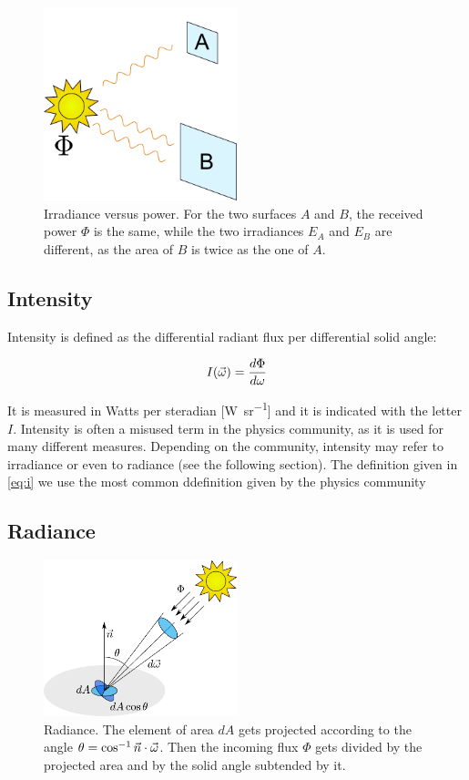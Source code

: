 \begin{figure}[!ht]
\centering
\includegraphics[width=0.5\textwidth]{images/irradiance.pdf}
\caption{Irradiance versus power. For the two surfaces $A$ and $B$, the received power $\Phi$ is the same, while the two irradiances $E_A$ and $E_B$ are different, as the area of $B$ is twice as the one of $A$.}
\label{fig:irradiance}
\end{figure}
 

\subsection{Intensity}
Intensity is defined as the differential radiant flux per differential solid angle:

$$
I(\vec{\omega}) = \frac{d \Phi}{d \omega}
\label{eq:i}
$$

It is measured in Watts per steradian [\si{\watt\per\steradian}] and it is indicated with the letter $I$. Intensity is often a misused term in the physics community, as it is used for many different measures. Depending on the community, intensity may refer to irradiance or even to radiance (see the following section). The definition given in \ref{eq:i} we use the most common ddefinition given by the physics community

\subsection{Radiance}

\begin{figure}[!ht]
\centering
\includegraphics[width=0.5\textwidth]{images/radiance.pdf}
\caption{Radiance. The element of area $dA$ gets projected according to the angle $\theta = \cos^{-1}{\vec{n} \cdot \vec{\omega}}$. Then the incoming flux $\Phi$ gets divided by the projected area and by the solid angle subtended by it.}
\label{fig:radiance}
\end{figure}


